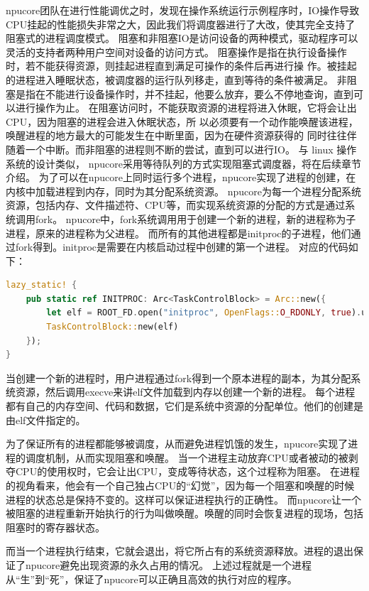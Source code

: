 npucore团队在进行性能调优之时，发现在操作系统运行示例程序时，IO操作导致CPU挂起的性能损失非常之大，因此我们将调度器进行了大改，使其完全支持了阻塞式的进程调度模式。
阻塞和非阻塞IO是访问设备的两种模式，驱动程序可以灵活的支持者两种用户空间对设备的访问方式。
阻塞操作是指在执行设备操作时，若不能获得资源，则挂起进程直到满足可操作的条件后再进行操
作。被挂起的进程进入睡眠状态，被调度器的运行队列移走，直到等待的条件被满足。
非阻塞是指在不能进行设备操作时，并不挂起，他要么放弃，要么不停地查询，直到可以进行操作为止。
在阻塞访问时，不能获取资源的进程将进入休眠，它将会让出CPU，因为阻塞的进程会进入休眠状态，所
以必须要有一个动作能唤醒该进程，唤醒进程的地方最大的可能发生在中断里面，因为在硬件资源获得的
同时往往伴随着一个中断。而非阻塞的进程则不断的尝试，直到可以进行IO。
与 linux 操作系统的设计类似， npucore采用等待队列的方式实现阻塞式调度器，将在后续章节介绍。
为了可以在npucore上同时运行多个进程，npucore实现了进程的创建，在内核中加载进程到内存，同时为其分配系统资源。
npucore为每一个进程分配系统资源，包括内存、文件描述符、CPU等，而实现系统资源的分配的方式是通过系统调用fork。
npucore中，fork系统调用用于创建一个新的进程，新的进程称为子进程，原来的进程称为父进程。
而所有的其他进程都是initproc的子进程，他们通过fork得到。initproc是需要在内核启动过程中创建的第一个进程。
对应的代码如下：
\begin{lstlisting}[language={Rust}]
    lazy_static! {
    pub static ref INITPROC: Arc<TaskControlBlock> = Arc::new({
        let elf = ROOT_FD.open("initproc", OpenFlags::O_RDONLY, true).unwrap();
        TaskControlBlock::new(elf)
    });
}
\end{lstlisting}
当创建一个新的进程时，用户进程通过fork得到一个原本进程的副本，为其分配系统资源，然后调用execve来讲elf文件加载到内存以创建一个新的进程。
每个进程都有自己的内存空间、代码和数据，它们是系统中资源的分配单位。他们的创建是由elf文件指定的。

为了保证所有的进程都能够被调度，从而避免进程饥饿的发生，npucore实现了进程的调度机制，从而实现阻塞和唤醒。
当一个进程主动放弃CPU或者被动的被剥夺CPU的使用权时，它会让出CPU，变成等待状态，这个过程称为阻塞。
在进程的视角看来，他会有一个自己独占CPU的“幻觉”，因为每一个阻塞和唤醒的时候进程的状态总是保持不变的。这样可以保证进程执行的正确性。
而npucore让一个被阻塞的进程重新开始执行的行为叫做唤醒。唤醒的同时会恢复进程的现场，包括阻塞时的寄存器状态。

而当一个进程执行结束，它就会退出，将它所占有的系统资源释放。进程的退出保证了npucore避免出现资源的永久占用的情况。
上述过程就是一个进程从“生”到“死”，保证了npucore可以正确且高效的执行对应的程序。

